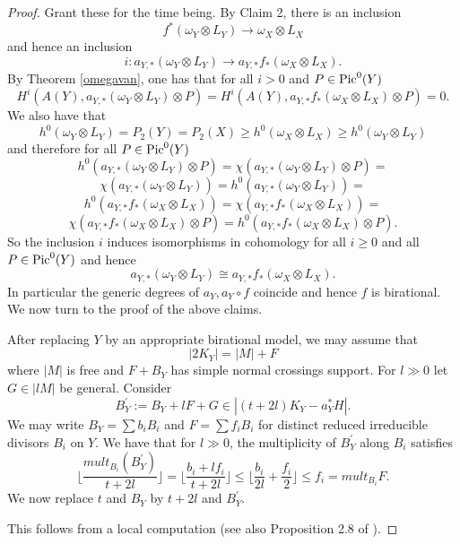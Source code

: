 \documentclass[10pt]{amsart}
\newcommand\Pic{{\text{\rm Pic}}}
\newcommand\alb{{ a}}
\newcommand\lra{\longrightarrow}
\newcommand\Alb{{ A}}
\newcommand\ot{{\otimes}}
\begin{document}
\begin{proof}
\bigskip
Grant these for the time being. By Claim 2, there is an inclusion 
$$f^*(\omega _Y\ot L_Y)\lra \omega _X \ot L_X$$
and hence an inclusion
$$i: \alb _{Y,*}(\omega _Y \ot L_Y) \lra \alb _{Y,*} f_*(\omega _X \ot L_X).$$
By Theorem \ref{omegavan}, 
one has that for all $i>0$ and $P\in \Pic ^0(Y)$
$$H^i(\Alb (Y),\alb _{Y,*}(\omega _Y \ot L_Y) \ot P)=
H^i(\Alb (Y), \alb _{Y,*} f_*(\omega _X \ot L_X)\ot P)=0.$$
We also have that $$h^0(\omega _Y \ot L_Y)=P_2(Y)=P_2(X)\geq 
h^0( \omega _X \ot L_X)
\geq h^0(\omega _Y \ot L_Y)$$
and therefore for all $P\in \Pic ^0(Y)$
$$h^0(\alb _{Y,*}(\omega _Y \ot L_Y)\ot P)=\chi (\alb _{Y,*}
(\omega _Y \ot L_Y)\ot P)=$$
$$\chi (\alb _{Y,*}(\omega _Y \ot L_Y))= h^0(\alb _{Y,*}(\omega _Y \ot L_Y))=$$
$$ h^0( \alb _{Y,*}f_*(\omega _X \ot L_X))=\chi( \alb _{Y,*}
f_*(\omega _X \ot L_X))= $$
$$\chi( \alb _{Y,*}f_*(\omega _X \ot L_X)\ot P)=h^0
( \alb _{Y,*}f_*(\omega _X \ot L_X)\ot P).$$
So the inclusion $i$ induces isomorphisms in cohomology 
for all $i\geq 0$ and all
$P\in \Pic ^0(Y)$ and hence 
$$\alb _{Y,*}(\omega _Y \ot L_Y) \cong \alb _{Y,*} f_*(\omega _X \ot L_X).$$
In particular the generic degrees of $\alb _Y, \alb _Y\circ f$ coincide and
hence $f$ is birational.
We now turn to the proof of the above claims.

\bigskip {} After replacing $Y$ by an 
appropriate birational 
model, we may assume that $$|2K_Y|=|M|+F$$
where $|M|$ is free and $F+B_Y$ has simple normal crossings support.
For $l\gg 0$ let $G\in |lM|$ be general.
Consider $$B^\prime _Y:=B_Y+lF+G\in |(t+2l)K_Y-\alb _Y^*H|.$$
We may write $B_Y=\sum b_iB_i$ and $F=\sum f_iB_i$ for distinct 
reduced irreducible
divisors $B_i$ on $Y$. We have that for $l\gg 0$,
the multiplicity of $B^\prime _Y$ along $B_i$
satisfies $$\lfloor \frac {mult _{B_i}(B^\prime _Y)}
{t+2l}\rfloor =\lfloor \frac
{b_i+lf_i}{t+2l}\rfloor\leq \lfloor \frac {b_i}{2l}+\frac 
{f_i}{2}\rfloor \leq f_i
=mult _{B_i} F.$$
We now replace $t$ and $B_Y$ by $t+2l$ and $B^\prime _Y$.

\bigskip 
{} This follows from a local computation
(see also Proposition 2.8 
of \cite{Ein}). 


\end{proof}
\end{document}
